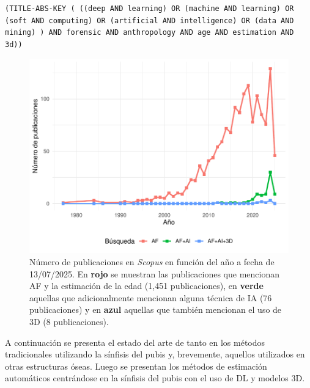 \begin{lstlisting}[caption={Cadena de búsqueda de \textit{Scopus} para obtener publicaciones de AF que referencian la estimación de la edad, hacen uso de alguna técnica de IA y utilizan datos 3D.}, captionpos=b, label=code__scopus_af_ai_3d, style=Consola]
(TITLE-ABS-KEY ( ((deep AND learning) OR (machine AND learning) OR (soft AND computing) OR (artificial AND intelligence) OR (data AND mining) ) AND forensic AND anthropology AND age AND estimation AND 3d))
\end{lstlisting}

\begin{figure}[h]
    \centering
    \includegraphics[width=\linewidth]{figures/3_sota/scopus_pubs.pdf}
    \caption[Publicaciones por año de AF, AF+IA y AF+IA+3D en Scopus]{Número de publicaciones en \textit{Scopus} en función del año a fecha de 13/07/2025. En {\color{Red} \textbf{rojo}} se muestran las publicaciones que mencionan AF y la estimación de la edad (1,451 publicaciones), en {\color{LimeGreen} \textbf{verde}} aquellas que adicionalmente mencionan alguna técnica de IA (76 publicaciones) y en {\color{Blue} \textbf{azul}} aquellas que también mencionan el uso de 3D (8 publicaciones).}
    \label{fig:scopusData}
\end{figure}

A continuación se presenta el estado del arte de tanto en los métodos tradicionales utilizando la sínfisis del pubis y, brevemente, aquellos utilizados en otras estructuras óseas. Luego se presentan los métodos de estimación automáticos centrándose en la sínfisis del pubis con el uso de DL y modelos 3D.

